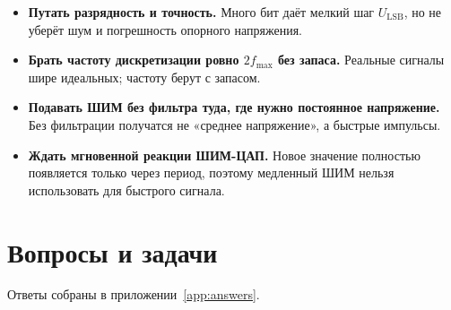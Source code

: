 \begin{warnbox}
\begin{itemize}
  \item \textbf{Путать разрядность и точность.} Много бит даёт мелкий шаг
        $U_\text{LSB}$, но не уберёт шум и погрешность опорного напряжения.
  \item \textbf{Брать частоту дискретизации ровно $2f_\text{max}$ без запаса.}
        Реальные сигналы шире идеальных; частоту берут с запасом.
  \item \textbf{Подавать ШИМ без фильтра туда, где нужно постоянное
        напряжение.} Без фильтрации получатся не «среднее напряжение», а
        быстрые импульсы.
  \item \textbf{Ждать мгновенной реакции ШИМ-ЦАП.} Новое значение полностью
        появляется только через период, поэтому медленный ШИМ нельзя
        использовать для быстрого сигнала.
\end{itemize}
\end{warnbox}

\section{Вопросы и задачи}
\label{sec:tasks-analog}

Ответы собраны в приложении~\ref{app:answers}.

